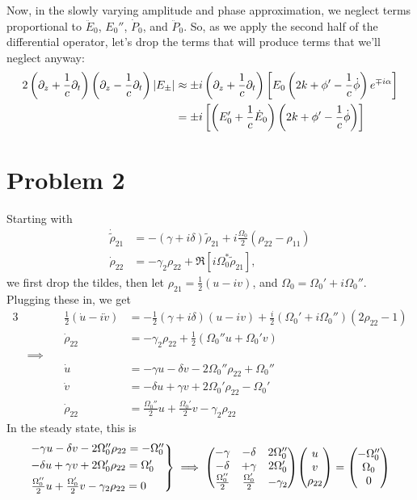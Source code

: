\documentclass[12pt]{article}
\begin{document}
Now, in the slowly varying amplitude and phase approximation, we neglect terms proportional to $\ddot{E}_0$, $E_0''$, $\dot{P}_0$, and $\ddot{P}_0$.
So, as we apply the second half of the differential operator, let's drop the terms that will produce terms that we'll neglect anyway:
\begin{align*}
    2\left(\partial_z + \frac{1}{c}\partial_t\right)\left(\partial_z - \frac{1}{c}\partial_t\right)\abs{E_\pm} &\approx \pm i\left(\partial_z + \frac{1}{c}\partial_t\right)\left[E_0\left(2k+\phi' - \frac{1}{c}\dot\phi\right)e^{\mp i\alpha}\right] \\
    &= \pm i \left[\left(E_0' + \frac{1}{c}\dot{E}_0\right)\left(2k+\phi' - \frac{1}{c}\dot\phi\right) \right]
\end{align*}

\section*{Problem 2}
Starting with
\begin{align*}
    \dot{\tilde{\rho}}_{21} &= -(\gamma+i\delta) \tilde{\rho}_{21} + i \frac{\Omega_0}{2}\left(\rho_{22}-\rho_{11}\right) \\
    \dot{\rho}_{22} &= -\gamma_2\rho_{22} + \Re[i\Omega_0^*\tilde{\rho}_{21}],
\end{align*}
we first drop the tildes, then let $\rho_{21} = \frac{1}{2}(u - iv)$, and $\Omega_0 = \Omega_0' + i\Omega_0''$. Plugging these in, we get
\begin{alignat*}{3}
    &\quad & \frac{1}{2}(\dot{u} - i\dot{v}) &= -\frac{1}{2}(\gamma + i\delta)(u-iv) + \frac{i}{2}\left(\Omega_0' + i\Omega_0''\right)\left(2\rho_{22} - 1\right) \\
    &\quad & \dot{\rho}_{22} &= -\gamma_2\rho_{22} + \frac{1}{2}\left(\Omega_0'' u + \Omega_0' v\right) \\
    &\implies\quad & &  \\
    &\quad & \dot{u} &= -\gamma u - \delta v - 2\Omega_0''\rho_{22} + \Omega_0'' \\
    &\quad & \dot{v} &= -\delta u + \gamma v + 2\Omega_0' \rho_{22} - \Omega_0'  \\
    &\quad & \dot{\rho}_{22} &= \frac{\Omega_0''}{2} u + \frac{\Omega_0'}{2}v - \gamma_2\rho_{22}
\end{alignat*}
In the steady state, this is   
\[
\begin{rcases*}
    -\gamma u -\delta v - 2\Omega_0''\rho_{22} = -\Omega_0'' \\
    -\delta u + \gamma v + 2\Omega_0'\rho_{22} = \Omega_0' \\
    \frac{\Omega_0''}{2} u + \frac{\Omega_0'}{2} v - \gamma_2\rho_{22} = 0
\end{rcases*}
\implies
\mqty(-\gamma&-\delta&2\Omega_0''\\-\delta&+\gamma&2\Omega_0'\\\frac{\Omega_0''}{2}&\frac{\Omega_0'}{2}&-\gamma_2)\mqty(u\\v\\\rho_{22}) = \mqty(-\Omega_0''\\\Omega_0\\0)
\]
\end{document}
